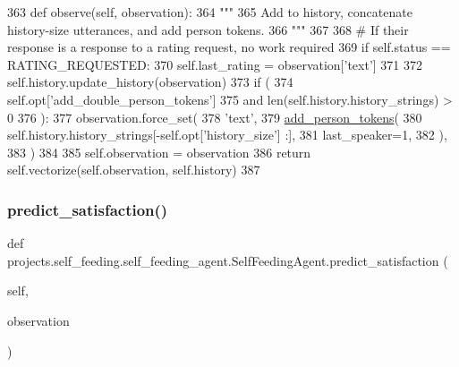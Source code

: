 \begin{DoxyCode}
363     \textcolor{keyword}{def }observe(self, observation):
364         \textcolor{stringliteral}{"""}
365 \textcolor{stringliteral}{        Add to history, concatenate history-size utterances, and add person tokens.}
366 \textcolor{stringliteral}{        """}
367 
368         \textcolor{comment}{# If their response is a response to a rating request, no work required}
369         \textcolor{keywordflow}{if} self.status == RATING\_REQUESTED:
370             self.last\_rating = observation[\textcolor{stringliteral}{'text'}]
371 
372         self.history.update\_history(observation)
373         \textcolor{keywordflow}{if} (
374             self.opt[\textcolor{stringliteral}{'add\_double\_person\_tokens'}]
375             \textcolor{keywordflow}{and} len(self.history.history\_strings) > 0
376         ):
377             observation.force\_set(
378                 \textcolor{stringliteral}{'text'},
379                 \hyperlink{namespaceprojects_1_1self__feeding_1_1utils_a3f3d055dc6c4058057baae7b240de5ec}{add\_person\_tokens}(
380                     self.history.history\_strings[-self.opt[\textcolor{stringliteral}{'history\_size'}] :],
381                     last\_speaker=1,
382                 ),
383             )
384 
385         self.observation = observation
386         \textcolor{keywordflow}{return} self.vectorize(self.observation, self.history)
387 
\end{DoxyCode}
\mbox{\label{classprojects_1_1self__feeding_1_1self__feeding__agent_1_1SelfFeedingAgent_abf84c3ae5ee4a7f80dfe3e441ad170b2}} 
\subsubsection{\texorpdfstring{predict\+\_\+satisfaction()}{predict\_satisfaction()}}
{\footnotesize\ttfamily def projects.\+self\+\_\+feeding.\+self\+\_\+feeding\+\_\+agent.\+Self\+Feeding\+Agent.\+predict\+\_\+satisfaction (\begin{DoxyParamCaption}\item[{}]{self,  }\item[{}]{observation }\end{DoxyParamCaption})}



